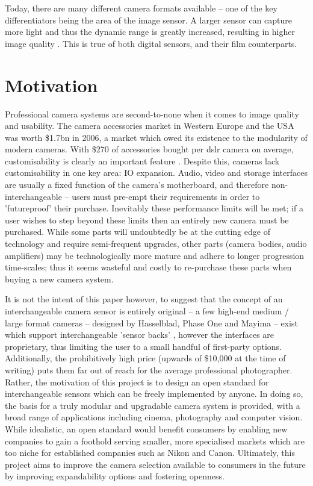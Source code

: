 \documentclass[a4paper]{report}
\begin{document}
Today, there are many different camera formats available -- one of the key differentiators being the area of the image sensor. A larger sensor can capture more light and thus the dynamic range is greatly increased, resulting in higher image quality \cite{8_chen_catrysse_el_gamal_wandell_2000}. This is true of both digital sensors, and their film counterparts.

\section{Motivation}

Professional camera systems are second-to-none when it comes to image quality and usability. The camera accessories market in Western Europe and the USA was worth \$1.7bn in 2006, a market which owed its existence to the modularity of modern cameras. With \$270 of accessories bought per \gls{dslr} camera on average, customisability is clearly an important feature \cite{9_understanding_and_solutions_2007}. Despite this, cameras lack customisability in one key area: IO expansion. Audio, video and storage interfaces are usually a fixed function of the camera's motherboard, and therefore non-interchangeable -- users must pre-empt their requirements in order to 'futureproof' their purchase. Inevitably these performance limits will be met; if a user wishes to step beyond these limits then an entirely new camera must be purchased. While some parts will undoubtedly be at the cutting edge of technology and require semi-frequent upgrades, other parts (camera bodies, audio amplifiers) may be technologically more mature and adhere to longer progression time-scales; thus it seems wasteful and costly to re-purchase these parts when buying a new camera system.

It is not the intent of this paper however, to suggest that the concept of an interchangeable camera sensor is entirely original -- a few high-end medium / large format cameras -- designed by Hasselblad, Phase One and Mayima -- exist which support interchangeable 'sensor backs' , however the interfaces are proprietary, thus limiting the user to a small handful of first-party options. Additionally, the prohibitively high price (upwards of \$10,000 at the time of writing) puts them far out of reach for the average professional photographer. Rather, the motivation of this project is to design an open standard for interchangeable sensors which can be freely implemented by anyone. In doing so, the basis for a truly modular and upgradable camera system is provided, with a broad range of applications including cinema, photography and computer vision. While idealistic, an open standard would benefit consumers by enabling new companies to gain a foothold serving smaller, more specialised markets which are too niche for established companies such as Nikon and Canon. Ultimately, this project aims to improve the camera selection available to consumers in the future by improving expandability options and fostering openness.
\end{document}
